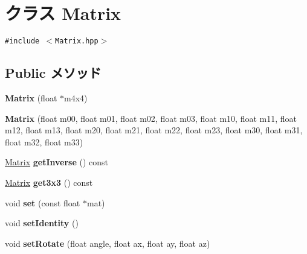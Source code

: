 \hypertarget{classm3g_1_1Matrix}{
\section{クラス Matrix}
\label{classm3g_1_1Matrix}
}
{\tt \#include $<$Matrix.hpp$>$}

\subsection*{Public メソッド}
\begin{CompactItemize}
\item 
\hypertarget{classm3g_1_1Matrix_04fd433badb74a2d60395217701d4009}{
\textbf{Matrix} (float $\ast$m4x4)}
\label{classm3g_1_1Matrix_04fd433badb74a2d60395217701d4009}

\item 
\hypertarget{classm3g_1_1Matrix_2c2f600f3a4c1db4a0da0b57db8aebca}{
\textbf{Matrix} (float m00, float m01, float m02, float m03, float m10, float m11, float m12, float m13, float m20, float m21, float m22, float m23, float m30, float m31, float m32, float m33)}
\label{classm3g_1_1Matrix_2c2f600f3a4c1db4a0da0b57db8aebca}

\item 
\hypertarget{classm3g_1_1Matrix_b26f91cb9ae99fad922140d93b886009}{
\hyperlink{classm3g_1_1Matrix}{Matrix} \textbf{getInverse} () const }
\label{classm3g_1_1Matrix_b26f91cb9ae99fad922140d93b886009}

\item 
\hypertarget{classm3g_1_1Matrix_01a293246687a4ce841623945f6c993d}{
\hyperlink{classm3g_1_1Matrix}{Matrix} \textbf{get3x3} () const }
\label{classm3g_1_1Matrix_01a293246687a4ce841623945f6c993d}

\item 
\hypertarget{classm3g_1_1Matrix_ed427d2cd38fe4a0b23f7f80803b7fd5}{
void \textbf{set} (const float $\ast$mat)}
\label{classm3g_1_1Matrix_ed427d2cd38fe4a0b23f7f80803b7fd5}

\item 
\hypertarget{classm3g_1_1Matrix_382e6ad7e6721b121e510959e1011be3}{
void \textbf{setIdentity} ()}
\label{classm3g_1_1Matrix_382e6ad7e6721b121e510959e1011be3}

\item 
\hypertarget{classm3g_1_1Matrix_c4e04770db1fedff14c37b5e4e4a68c6}{
void \textbf{setRotate} (float angle, float ax, float ay, float az)}
\label{classm3g_1_1Matrix_c4e04770db1fedff14c37b5e4e4a68c6}


\end{CompactItemize}
